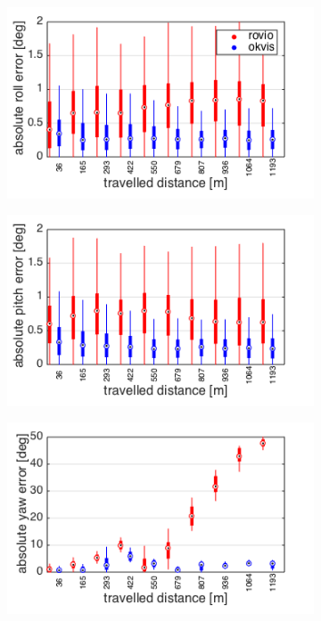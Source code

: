 \begin{figure}[h]
  \begin{subfigure}[b]{0.48\textwidth}
    \includegraphics[width=\textwidth]{images/ijrr/aoe_r.png}
    \caption{}
  \end{subfigure}
  \hfill
  \begin{subfigure}[b]{0.48\textwidth}
    \includegraphics[width=\textwidth]{images/ijrr/aoe_p.png}
    \caption{}
  \end{subfigure}
  \begin{subfigure}[b]{0.48\textwidth}
    \includegraphics[width=\textwidth]{images/ijrr/aoe_y.png}

\end{subfigure}
\end{figure}

